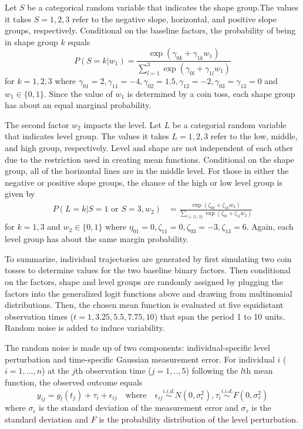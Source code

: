 Let $S$ be a categorical random variable that indicates the shape group.The values it takes $S=1,2,3$ refer to the negative slope, horizontal, and positive slope groups, respectively. Conditional on the baseline factors, the probability of being in shape group $k$ equals
$$P(S=k |w_{1}) = \frac{\exp(\gamma_{0k}+\gamma_{1k}w_{1})}{\sum^{3}_{l=1} \exp(\gamma_{0l}+\gamma_{1l}w_{1})}$$
for $k=1,2,3$ where $\gamma_{01}=2,\gamma_{11} = -4,\gamma_{02}=1.5,\gamma_{12}=-2,\gamma_{03}=\gamma_{13} = 0$ and $w_{1}\in\{0,1\}$. Since the value of $w_{1}$ is determined by a coin toss, each shape group has about an equal marginal probability. 

The second factor $w_{2}$ impacts the level. Let $L$ be a categorial random variable that indicates level group. The values it takes $L=1,2,3$ refer to the low, middle, and high group, respectively. Level and shape are not independent of each other due to the restriction used in creating mean functions. Conditional on the shape group, all of the horizontal lines are in the middle level. For those in either the negative or positive slope groups, the chance of the high or low level group is given by
\begin{align*}
P(L=k|S=1 \text{ or } S=3,w_{2}) & = \frac{\exp(\zeta_{0k}+\zeta_{1k} w_{2})}{\sum_{l\in\{1,3\} }\exp(\zeta_{0l}+\zeta_{1l}w_{2})}
\end{align*}
for $k=1,3$ and $w_{2}\in\{0,1\}$ where $\eta_{01}=0,\zeta_{11}=0,\zeta_{03}=-3,\zeta_{13}=6$. Again, each level group has about the same margin probability.

To summarize, individual trajectories are generated by first simulating two coin tosses to determine values for the two baseline binary factors. Then conditional on the factors, shape and level groups are randomly assigned by plugging the factors into the generalized logit functions above and drawing from multinomial distributions. Then, the chosen mean function is evaluated at five equidistant observation times ($t=1,3.25,5.5,7.75,10$) that span the period 1 to 10 units. Random noise is added to induce variability. 

The random noise is made up of two components: individual-specific level perturbation and time-specific Gaussian measurement error. For individual $i$ ($i=1,...,n$) at the $j$th observation time ($j=1,..,5$) following the $l$th mean function, the observed outcome equals
$$y_{ij} = g_{l}(t_{j})+\tau_{i}+\epsilon_{ij}\quad\text{where}\quad \epsilon_{ij}\stackrel{i.i.d.}{\sim} N(0,\sigma_{\epsilon}^{2}), \tau_{i}\stackrel{i.i.d.}{\sim} F(0,\sigma_{\tau}^{2})$$
where $\sigma_{\epsilon}$  is the standard deviation of the measurement error and $\sigma_{\tau}$ is the standard deviation and $F$ is the probability distribution of the level perturbation.
 
